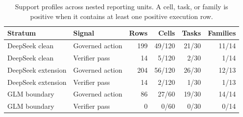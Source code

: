 
\begin{table}[H]
\centering
\caption{Support profiles across nested reporting units. A cell, task, or family is positive when it contains at least one positive execution row.}
\label{tab:support}
\small
\begin{tabular}{@{}llrrrr@{}}
\toprule
Stratum & Signal & Rows & Cells & Tasks & Families \\
\midrule
DeepSeek clean & Governed action & 199 & 49/120 & 21/30 & 11/14 \\
DeepSeek clean & Verifier pass & 14 & 5/120 & 2/30 & 1/14 \\
DeepSeek extension & Governed action & 204 & 56/120 & 26/30 & 12/13 \\
DeepSeek extension & Verifier pass & 14 & 2/120 & 1/30 & 1/13 \\
GLM boundary & Governed action & 86 & 27/60 & 19/30 & 14/14 \\
GLM boundary & Verifier pass & 0 & 0/60 & 0/30 & 0/14 \\
\bottomrule
\end{tabular}
\end{table}
